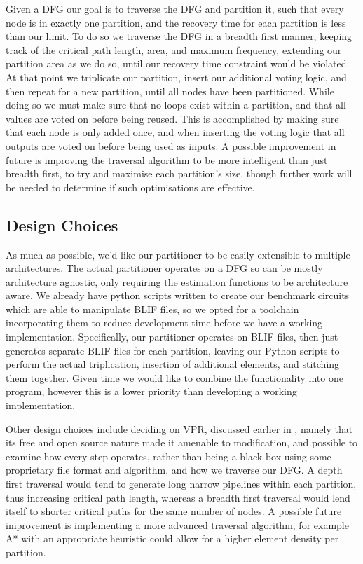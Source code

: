 \documentclass[12pt,drafta4paper,oneside]{memoir} %
\begin{document}
{Given a \ac{DFG} our goal is to traverse the \ac{DFG} and partition it, such that every node is in exactly one partition, and the recovery time for each partition is less than our limit.
To do so we traverse the \ac{DFG} in a breadth first manner, keeping track of the critical path length, area, and maximum frequency, extending our partition area as we do so, until our recovery time constraint would be violated. At that point we triplicate our partition, insert our additional voting logic, and then repeat for a new partition, until all nodes have been partitioned.  While doing so we must make sure that no loops exist within a partition, and that all values are voted on before being reused. This is accomplished by making sure that each node is only added once, and when inserting the voting logic that all outputs are voted on before being used as inputs.
A possible improvement in future is improving the traversal algorithm to be more intelligent than just breadth first, to try and maximise each partition's size, though further work will be needed to determine if such optimisations are effective.

\subsection{Design Choices}
As much as possible, we'd like our partitioner to be easily extensible to multiple architectures. The actual partitioner operates on a \ac{DFG} so can be mostly architecture agnostic, only requiring the estimation functions to be architecture aware.
We already have python scripts written to create our benchmark circuits which are able to manipulate \ac{BLIF} files, so we opted for a toolchain incorporating them to reduce development time before we have a working implementation. Specifically, our partitioner operates on \ac{BLIF} files, then just generates separate \ac{BLIF} files for each partition, leaving our Python scripts to perform the actual triplication, insertion of additional elements, and stitching them together. Given time we would like to combine the functionality into one program, however this is a lower priority than developing a working implementation.

Other design choices include deciding on \ac{VPR}, discussed earlier in , namely that its free and open source nature made it amenable to modification, and possible to examine how every step operates, rather than being a black box using some proprietary file format and algorithm, and how we traverse our \ac{DFG}. A depth first traversal would tend to generate long narrow pipelines within each partition, thus increasing critical path length, whereas a breadth first traversal would lend itself to shorter critical paths for the same number of nodes. A possible future improvement is implementing a more advanced traversal algorithm, for example A* with an appropriate heuristic could allow for a higher element density per partition.

}
\end{document}
